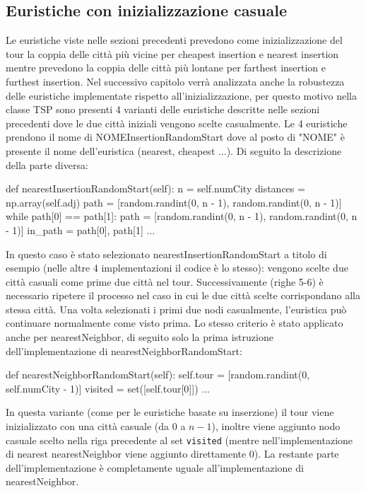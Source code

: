 \documentclass[a4paper,12pt]{report}
\begin{document}
\subsection{Euristiche con inizializzazione casuale}
Le euristiche viste nelle sezioni precedenti prevedono come inizializzazione del tour la coppia delle città più vicine per cheapest insertion e nearest insertion mentre prevedono la coppia delle città più lontane per farthest insertion e furthest insertion. Nel successivo capitolo verrà analizzata anche la robustezza delle euristiche implementate rispetto all'inizializzazione, per questo motivo nella classe TSP sono presenti 4 varianti delle euristiche descritte nelle sezioni precedenti dove le due città iniziali vengono scelte casualmente. Le 4 euristiche prendono il nome di NOMEInsertionRandomStart dove al posto di "NOME" è presente il nome dell'euristica (nearest, cheapest ...). Di seguito la descrizione della parte diversa:
\begin{python}
def nearestInsertionRandomStart(self):
  n = self.numCity
  distances = np.array(self.adj)
  path = [random.randint(0, n - 1), random.randint(0, n - 1)]
  while path[0] == path[1]:
    path = [random.randint(0, n - 1), random.randint(0, n - 1)]
  in_path = {path[0], path[1]}
  ...
\end{python}
In questo caso è stato selezionato nearestInsertionRandomStart a titolo di esempio (nelle altre 4 implementazioni il codice è lo stesso): vengono scelte due città casuali come prime due città nel tour. Successivamente (righe 5-6) è necessario ripetere il processo nel caso in cui le due città scelte corrispondano alla stessa città. Una volta selezionati i primi due nodi casualmente, l'euristica può continuare normalmente come visto prima.
Lo stesso criterio è stato applicato anche per nearestNeighbor, di seguito solo la prima istruzione dell'implementazione di nearestNeighborRandomStart:
\begin{python}
def nearestNeighborRandomStart(self):
  self.tour = [random.randint(0, self.numCity - 1)]
  visited = set([self.tour[0]])
  ...
\end{python}
In questa variante (come per le euristiche basate su inserzione) il tour viene inizializzato con una città casuale (da 0 a $n - 1$), inoltre viene aggiunto nodo casuale scelto nella riga precedente al set \lstinline!visited! (mentre nell'implementazione di nearest nearestNeighbor viene aggiunto direttamente 0). La restante parte dell'implementazione è completamente uguale all'implementazione di nearestNeighbor.
 
\end{document}
